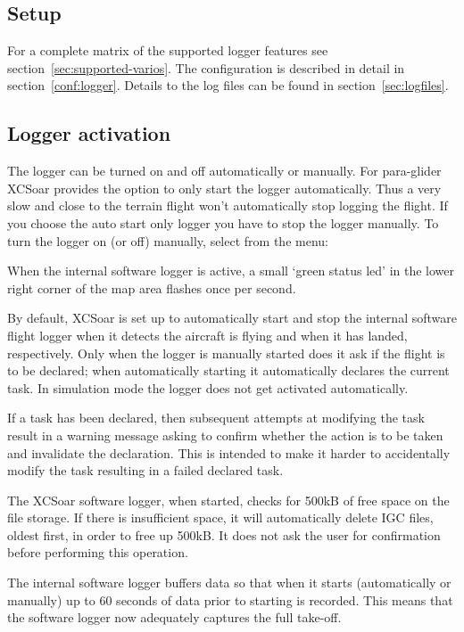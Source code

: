 \subsection*{Setup}
For a complete matrix of the supported logger features see section~\ref{sec:supported-varios}.  
The configuration is described in detail in section~\ref{conf:logger}.  Details 
to the log files can be found in section~\ref{sec:logfiles}.

\subsection*{Logger activation}
The logger can be turned on and off automatically or manually.  For para-glider 
XCSoar provides the option to only start the logger automatically. Thus a very 
slow and close to the terrain flight won't automatically stop logging the flight. 
If you choose the auto start only logger you have to stop the logger manually.
To turn the logger on (or off) manually, select from the menu:
\begin{quote}
\blink{}
\end{quote}

When the internal software logger is active, a small `green status led' in the
lower right corner of the map area flashes once per second.

By default, XCSoar is set up to automatically start and stop the
internal software flight logger when it detects the aircraft is flying
and when it has landed, respectively.  Only when the logger is
manually started does it ask if the flight is to be declared; when
automatically starting it automatically declares the current task.
In simulation mode the logger does not get activated automatically.

If a task has been declared, then subsequent attempts at modifying the
task result in a warning message asking to confirm whether the action
is to be taken and invalidate the declaration.  This is intended to
make it harder to accidentally modify the task resulting in a failed
declared task.

The XCSoar software logger, when started, checks for 500kB of free
space on the file storage.  If there is insufficient space, it will
automatically delete IGC files, oldest first, in order to free up
500kB.  It does not ask the user for confirmation before performing
this operation. \warning

The internal software logger buffers data so that when it starts
(automatically or manually) up to 60 seconds of data prior to starting
is recorded.  This means that the software logger now adequately
captures the full take-off.

